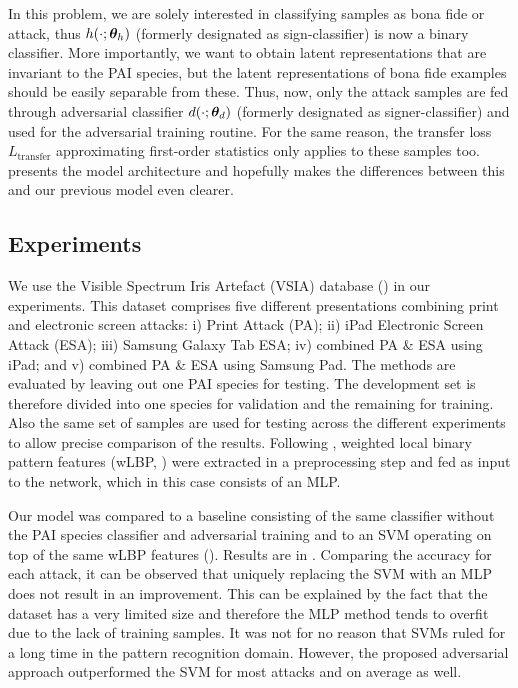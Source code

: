 In this problem, we are solely interested in classifying samples as bona fide or attack, thus $h(\cdot;{\bm{\theta}}_h)$ (formerly designated as sign-classifier) is now a binary classifier. More importantly, we want to obtain latent representations that are invariant to the PAI species, but the latent representations of bona fide examples should be easily separable from these. Thus, now, only the attack samples are fed through adversarial classifier $d(\cdot;{\bm{\theta}}_d)$ (formerly designated as signer-classifier) and used for the adversarial training routine. For the same reason, the transfer loss $L_{\text{transfer}}$ approximating first-order statistics only applies to these samples too.  presents the model architecture and hopefully makes the differences between this and our previous model even clearer.



\subsection{Experiments}
\label{sec:adv_iris_attack_experiments}
We use the Visible Spectrum Iris Artefact (VSIA) database (\citet{raghavendra2015VSIA}) in our experiments. This dataset comprises five different presentations combining print and electronic screen attacks: i) Print Attack (PA); ii) iPad Electronic Screen Attack (ESA); iii) Samsung Galaxy Tab ESA; iv) combined PA \& ESA using iPad; and v) combined PA \& ESA using Samsung Pad. The methods are evaluated by leaving out one PAI species for testing. The development set is therefore divided into one species for validation and the remaining for training. Also the same set of samples are used for testing across the different experiments to allow precise comparison of the results. Following \citet{sequeira2016realistic}, weighted local binary pattern features (wLBP, \citet{zhang2010contact}) were extracted in a preprocessing step and fed as input to the network, which in this case consists of an MLP.

Our model was compared to a baseline consisting of the same classifier without the PAI species classifier and adversarial training and to an SVM operating on top of the same wLBP features (\citet{sequeira2016realistic}). Results are in . Comparing the accuracy for each attack, it can be observed that uniquely replacing the SVM with an MLP does not result in an improvement. This can be explained by the fact that the dataset has a very limited size and therefore the MLP method tends to overfit due to the lack of training samples. It was not for no reason that SVMs ruled for a long time in the pattern recognition domain. However, the proposed adversarial approach outperformed the SVM for most attacks and on average as well.

